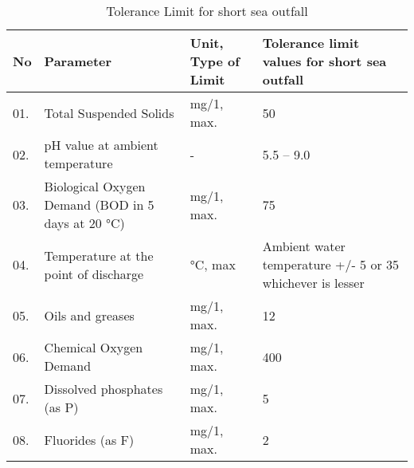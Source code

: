 \begin{table}[H]
\caption{Tolerance Limit for short sea outfall}
\centering
\begin{tabular}{|p{0.5cm}|p{6cm}|p{3.5cm}|p{4cm}|} \hline
No & Parameter & Unit, Type of Limit & Tolerance limit values for short sea outfall \\ \hline
01. & Total Suspended Solids  & mg/1, max. & 50 \\ \hline
02. & pH value at ambient temperature & - & 5.5 – 9.0 \\ \hline
03. & Biological Oxygen Demand (BOD in 5 days at 20 °C) & mg/1, max. & 75 \\ \hline
04. & Temperature at the point of discharge & °C, max & Ambient water temperature +/- 5 or 35 whichever is lesser \\ \hline
05. & Oils and greases & mg/1, max. & 12  \\ \hline
06. & Chemical Oxygen Demand  & mg/1, max. & 400  \\ \hline
07. & Dissolved phosphates (as P) & mg/1, max. & 5  \\ \hline
08. & Fluorides (as F) & mg/1, max. & 2  \\ \hline
\end{tabular}
\label{table:tolerance_limit_details}
\end{table}